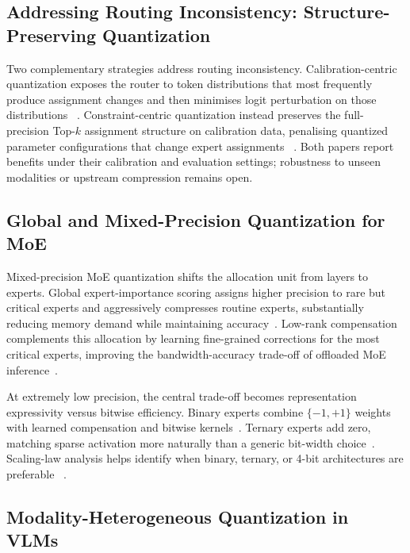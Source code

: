 \documentclass[10pt]{article}
\begin{document}
\subsection{Addressing Routing Inconsistency: Structure-Preserving Quantization}

Two complementary strategies address routing inconsistency.  Calibration-centric
quantization exposes the router to token distributions that most frequently produce
assignment changes and then minimises logit perturbation on those distributions
~\citep{fu2026eaquantenhancingposttrainingquantization}.  Constraint-centric quantization instead preserves the full-
precision Top-$k$ assignment structure on calibration data, penalising quantized
parameter configurations that change expert assignments
~\citep{park2026valueandstructurealignmentroutingconsistentquantization}.  Both papers
report benefits under their calibration and evaluation settings; robustness to unseen
modalities or upstream compression remains open.

\subsection{Global and Mixed-Precision Quantization for MoE}

Mixed-precision MoE quantization shifts the allocation unit from layers to experts.
Global expert-importance scoring assigns higher precision to rare but critical experts
and aggressively compresses routine experts, substantially reducing memory demand while
maintaining accuracy~\citep{deng2026gemqglobalexpertlevelmixedprecision}.  Low-rank compensation complements
this allocation by learning fine-grained corrections for the most critical experts,
improving the bandwidth-accuracy trade-off of offloaded MoE inference~\citep{liu2025bandwidthefficientadaptivemixtureofexpertslowrank}.

At extremely low precision, the central trade-off becomes representation expressivity
versus bitwise efficiency.  Binary experts combine $\{-1,+1\}$ weights with learned
compensation and bitwise kernels~\citep{zhao2026mobieefficientinferencemixture}.
Ternary experts add zero, matching sparse activation more naturally than a generic
bit-width choice~\citep{wang2026motemixtureternaryexperts}.  Scaling-law analysis helps
identify when binary, ternary, or 4-bit architectures are preferable
~\citep{liu2025paretoqimprovingscalinglaws}.

\subsection{Modality-Heterogeneous Quantization in VLMs}
\end{document}
